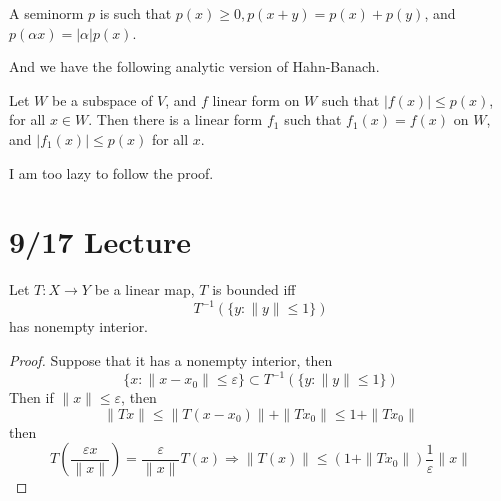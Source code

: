 \documentclass[openany]{book}
\begin{document}
\begin{defn}
    A seminorm $p$ is such that $p(x)\geq 0, p(x+y)=p(x)+p(y)$, and $p(\alpha x)=|\alpha|p(x)$.
\end{defn}

And we have the following analytic version of Hahn-Banach.
\begin{prop}
    Let $W$ be a subspace of $V$, and $f$ linear form on $W$ such that $|f(x)|\leq p(x)$, for all $x\in W$. Then there is a linear form $f_1$ such that $f_1(x)=f(x)$ on $W$, and $|f_1(x)|\leq p(x)$ for all $x$.
\end{prop}
I am too lazy to follow the proof.

\section{9/17 Lecture}

\begin{prop}
    Let $T:X\to Y$ be a linear map, $T$ is bounded iff 
    \begin{equation*}
        T^{-1}(\{y: \|y\|\leq 1\})
    \end{equation*}
    has nonempty interior. 
\end{prop}
\begin{proof}
    Suppose that it has a nonempty interior, then 
    \begin{equation*}
        \{x: \|x-x_0\|\leq\varepsilon\}\subset T^{-1}(\{y: \|y\|\leq 1\})
    \end{equation*}
    Then if $\|x\|\leq\varepsilon$, then 
    \begin{equation*}
        \|Tx\|\leq\|T(x-x_0)\|+\|Tx_0\|\leq 1+\|Tx_0\|
    \end{equation*}
    then 
    \begin{equation*}
        T\left(\frac{\varepsilon x}{\|x\|}\right)=\frac{\varepsilon}{\|x\|}T(x)\Rightarrow \|T(x)\|\leq(1+\|Tx_0\|)\frac{1}{\varepsilon}\|x\|
    \end{equation*}
\end{proof}
\end{document}

